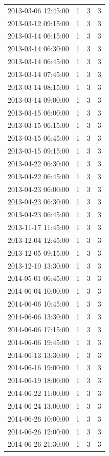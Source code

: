 \begin{tabular}{lrrr}
2013-03-06 12:45:00 & 1 & 3 & 3 \\
2013-03-12 09:15:00 & 1 & 3 & 3 \\
2013-03-14 06:15:00 & 1 & 3 & 3 \\
2013-03-14 06:30:00 & 1 & 3 & 3 \\
2013-03-14 06:45:00 & 1 & 3 & 3 \\
2013-03-14 07:45:00 & 1 & 3 & 3 \\
2013-03-14 08:15:00 & 1 & 3 & 3 \\
2013-03-14 09:00:00 & 1 & 3 & 3 \\
2013-03-15 06:00:00 & 1 & 3 & 3 \\
2013-03-15 06:15:00 & 1 & 3 & 3 \\
2013-03-15 06:45:00 & 1 & 3 & 3 \\
2013-03-15 09:15:00 & 1 & 3 & 3 \\
2013-04-22 06:30:00 & 1 & 3 & 3 \\
2013-04-22 06:45:00 & 1 & 3 & 3 \\
2013-04-23 06:00:00 & 1 & 3 & 3 \\
2013-04-23 06:30:00 & 1 & 3 & 3 \\
2013-04-23 06:45:00 & 1 & 3 & 3 \\
2013-11-17 11:45:00 & 1 & 3 & 3 \\
2013-12-04 12:45:00 & 1 & 3 & 3 \\
2013-12-05 09:15:00 & 1 & 3 & 3 \\
2013-12-10 13:30:00 & 1 & 3 & 3 \\
2014-05-01 06:45:00 & 1 & 3 & 3 \\
2014-06-04 10:00:00 & 1 & 3 & 3 \\
2014-06-06 10:45:00 & 1 & 3 & 3 \\
2014-06-06 13:30:00 & 1 & 3 & 3 \\
2014-06-06 17:15:00 & 1 & 3 & 3 \\
2014-06-06 19:45:00 & 1 & 3 & 3 \\
2014-06-13 13:30:00 & 1 & 3 & 3 \\
2014-06-16 19:00:00 & 1 & 3 & 3 \\
2014-06-19 18:00:00 & 1 & 3 & 3 \\
2014-06-22 11:00:00 & 1 & 3 & 3 \\
2014-06-24 13:00:00 & 1 & 3 & 3 \\
2014-06-26 10:00:00 & 1 & 3 & 3 \\
2014-06-26 12:00:00 & 1 & 3 & 3 \\
2014-06-26 21:30:00 & 1 & 3 & 3 \\

\end{tabular}
